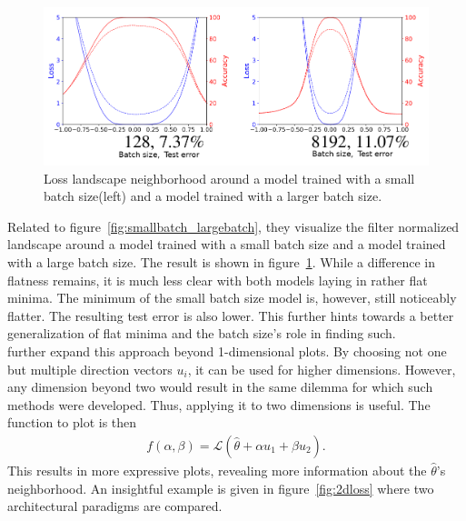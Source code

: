 \documentclass[a4paper]{scrartcl}
\begin{document}
\begin{figure}[H]
	\centering
	\includegraphics[width=.7\linewidth]{figures/batch_size_normalized.png}
	\caption{Loss landscape neighborhood around a model trained with a small batch size(left) and a model trained with a larger batch size.}
	\label{fig:smallbatch_largebatch_normalized}
\end{figure}
Related to figure~\ref{fig:smallbatch_largebatch}, they visualize the filter normalized landscape around a model trained with a small batch size and a model trained with a large batch size. The result is shown in figure~\ref{fig:smallbatch_largebatch_normalized}. While a difference in flatness remains, it is much less clear with both models laying in rather flat minima. The minimum of the small batch size model is, however, still noticeably flatter. The resulting test error is also lower. This further hints towards a better generalization of flat minima and the batch size's role in finding such.\\
\cite{li2017visualizing} further expand this approach beyond 1-dimensional plots. By choosing not one but multiple direction vectors $u_i$, it can be used for higher dimensions. However, any dimension beyond two would result in the same dilemma for which such methods were developed. Thus, applying it to two dimensions is useful. The function to plot is then
\begin{align*}
		f(\alpha, \beta) = \mathcal{L}(\hat{\theta} + \alpha u_1 + \beta u_2).
\end{align*}
This results in more expressive plots, revealing more information about the $\hat{\theta}$'s neighborhood. An insightful example is given in figure~\ref{fig:2dloss} where two architectural paradigms are compared. 
\end{document}
